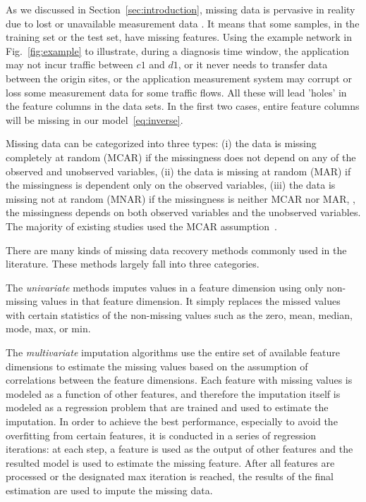 As we discussed in Section~\ref{sec:introduction}, missing data is pervasive in reality due to lost or unavailable measurement data . 
It means that some samples, in the training set or the test set, have missing features. 
Using the example network in Fig.~\ref{fig:example} to illustrate, during a diagnosis time window, the application may not incur traffic between 
$c1$ and $d1$, or it never needs to transfer data between the origin sites, or the application measurement system may corrupt or loss some 
measurement data for some traffic flows. All these will lead 'holes' in the feature columns in the data sets. In the first two cases, 
entire feature columns will be missing in our model~\ref{eq:inverse}.

Missing data can be categorized into three types: (i) the data is missing completely at random (MCAR) if the missingness does not depend 
on any of the observed and unobserved variables, (ii) the data is missing at random (MAR) if the missingness is dependent only on the observed variables, 
(iii) the data is missing not at random (MNAR) if the missingness is neither MCAR nor MAR, \ie, the missingness depends on both observed variables and the 
unobserved variables. The majority of existing studies used the MCAR assumption~\cite{Yoon2018GAINMD}. 

There are many kinds of missing data recovery methods commonly used in the literature. These methods largely fall into three categories.

The {\it univariate} methods imputes values in a  feature dimension using only non-missing values in that feature dimension. It simply replaces the missed 
values with certain statistics of the non-missing values such as the zero, mean, median, mode, max, or min. 

The {\it multivariate} imputation algorithms use the entire set of available feature dimensions to estimate the missing values based on the assumption 
of correlations between the feature dimensions. Each feature with missing values is modeled as a function of other features, and therefore the imputation itself 
is modeled as a regression problem that are trained and used to estimate the imputation. In order to achieve the best performance, especially to avoid the 
overfitting from certain features, it is conducted in a series of regression iterations: at each step, a feature is used as the output of other features and the resulted model is used to estimate the missing feature. After all features are processed or the designated max iteration is reached, the results of the final estimation are used to impute 
the missing data.

